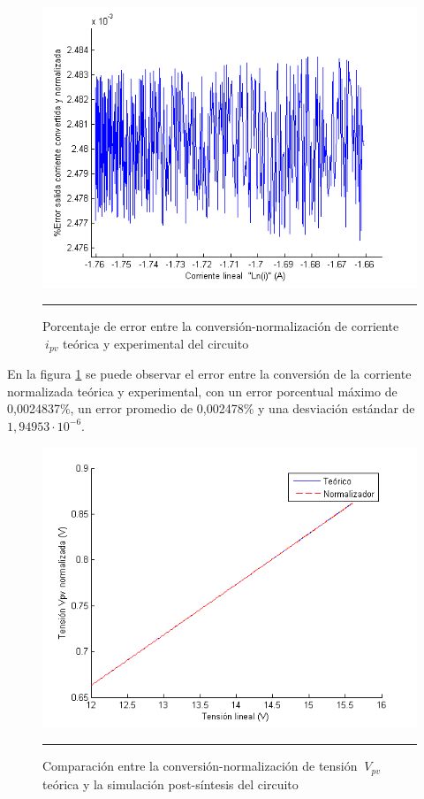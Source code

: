   \begin{figure}[H]
  \centering
    \includegraphics[scale=0.8]{./ERROR_CONV_NORM_I.png}
    \rule{35em}{0.5pt}
  \caption[Porcentaje de error entre la conversión-normalización de corriente $\ i_{pv}$ teórica y experimental del circuito]{Porcentaje de error entre la conversión-normalización de corriente $\ i_{pv}$ teórica y experimental del circuito}
  \label{fig:ENORMI}
\end{figure}

En la figura \ref{fig:ENORMI} se puede observar el error entre la conversión de la corriente normalizada teórica y experimental, con un error porcentual máximo de 0,0024837\%, un error promedio de 0,002478\% y una desviación estándar de $ 1,94953 \cdot 10^{-6} $.


  \begin{figure}[H]
  \centering
    \includegraphics[scale=0.8]{./Normalizador_V.png}
    \rule{35em}{0.5pt}
  \caption[Comparación entre la conversión-normalización de tensión $\ V_{pv}$ teórica y la simulación post-síntesis del circuito]{Comparación entre la conversión-normalización de tensión  $\ V_{pv}$ teórica y la simulación post-síntesis del circuito}
  \label{fig:NORMV}
\end{figure}


